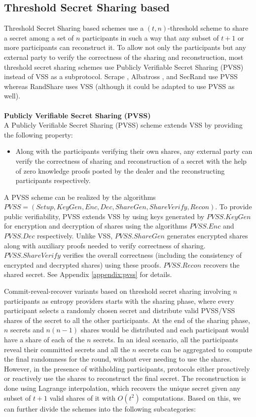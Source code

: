 \documentclass[letterpaper,twocolumn,10pt]{article}
\theoremstyle{definition}
\theoremstyle{remark}
\begin{document}
\subsection{Threshold Secret Sharing based}
Threshold Secret Sharing based schemes use a $(t,n)$-threshold scheme to share a secret among a set of $n$ participants in such a way that any subset of $t+1$ or more participants can reconstruct it. To allow not only the participants but any external party to verify the correctness of the sharing and reconstruction, most threshold secret sharing schemes use Publicly Verifiable Secret Sharing (PVSS)  \cite{schoenmakers1999simple, cascudo2017scrape} instead of VSS as a subprotocol. Scrape \cite{cascudo2017scrape}, Albatross \cite{cascudo2020albatross}, and SecRand \cite{guo2020secRand} use PVSS whereas RandShare \cite{syta2017scalable} uses VSS (although it could be adapted to use PVSS as well).\\\\
\textbf{Publicly Verifiable Secret Sharing (PVSS)}\\
A Publicly Verifiable Secret Sharing (PVSS) scheme extends VSS by providing the following property:
\begin{itemize}
    \item Along with the participants verifying their own shares, any external party can verify the correctness of sharing and reconstruction of a secret with the help of zero knowledge proofs posted by the dealer and the reconstructing participants respectively.
\end{itemize}
A PVSS scheme can be realized by the algorithms $PVSS = (Setup, KeyGen, Enc, Dec, ShareGen, ShareVerify, Recon)$. To provide public verifiability, PVSS extends VSS by using keys generated by $PVSS.KeyGen$ for encryption and decryption of shares using the algorithms $PVSS.Enc$ and $PVSS.Dec$ respectively. Unlike VSS, $PVSS.ShareGen$ generates encrypted shares along with auxiliary proofs needed to verify correctness of sharing. $PVSS.ShareVerify$ verifies the overall correctness (including the consistency of encrypted and decrypted shares) using these proofs. $PVSS.Recon$ recovers the shared secret. See Appendix \ref{appendix:pvss} for details.

Commit-reveal-recover variants based on threshold secret sharing involving $n$ participants as entropy providers starts with the sharing phase, where every participant selects a randomly chosen secret and distribute valid PVSS/VSS shares of the secret to all the other participants. At the end of the sharing phase, $n$ secrets and $n(n-1)$ shares would be distributed and each participant would have a share of each of the $n$ secrets. In an ideal scenario, all the participants reveal their committed secrets and all the $n$ secrets can be aggregated to compute the final randomness for the round, without ever needing to use the shares. However, in the presence of withholding participants, protocols either proactively or reactively use the shares to reconstruct the final secret. The reconstruction is done using Lagrange interpolation, which recovers the unique secret given any subset of $t+1$ valid shares of it with $O(t^2)$ computations. Based on this, we can further divide the schemes into the following subcategories:
\end{document}
